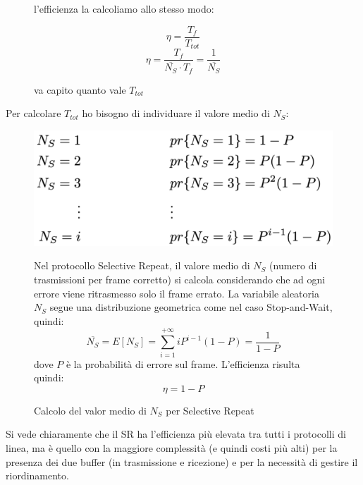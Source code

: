 \begin{figure}[htbp]
\begin{minipage}{0.55\textwidth}
        l'efficienza la calcoliamo allo stesso modo:

        \begin{equation}
        \eta = \frac{T_f}{T_{tot}}
        \end{equation}
         \begin{equation}
        \eta = \frac{T_f}{\overline{N_S} \cdot T_f} = \frac{1}{\overline{N_S}}
        \end{equation}

        va capito quanto vale $T_{tot}$

    \end{minipage}
\end{figure}

Per calcolare $T_{tot}$ ho bisogno di individuare il valore medio di $N_S$:

\begin{figure}[htbp]
    \centering
    \begin{minipage}{0.45\textwidth}
        \includegraphics[width=\linewidth]{images/nssr.png}
        \caption{Calcolo del valor medio di $N_S$ per Selective Repeat}
    \end{minipage}%
    \hfill
    \begin{minipage}{0.5\textwidth}
        Nel protocollo Selective Repeat, il valore medio di $N_S$ (numero di trasmissioni per frame corretto) si calcola considerando che ad ogni errore viene ritrasmesso solo il frame errato. La variabile aleatoria $N_S$ segue una distribuzione geometrica come nel caso Stop-and-Wait, quindi:
        \[
        \overline{N_S} = E[N_S] = \sum_{i=1}^{+\infty} i P^{i-1}(1-P) = \frac{1}{1-P}
        \]
        dove $P$ è la probabilità di errore sul frame. L'efficienza risulta quindi:
        \[
        \eta = 1 - P
        \]
    \end{minipage}
\end{figure}

Si vede chiaramente che il SR ha l'efficienza più elevata tra
tutti i protocolli di linea, ma è quello con la maggiore
complessità (e quindi costi più alti) per la presenza dei due
buffer (in trasmissione e ricezione) e per la necessità di
gestire il riordinamento.

